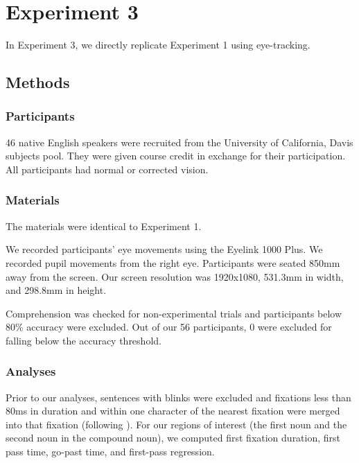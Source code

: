 \documentclass[
  12pt,
  letterpaper,
]{scrreprt}
\begin{document}
\section{Experiment 3}\label{experiment-3}

In Experiment 3, we directly replicate Experiment 1 using eye-tracking.

\subsection{Methods}\label{methods-2}

\subsubsection{Participants}\label{participants-2}

46 native English speakers were recruited from the University of
California, Davis subjects pool. They were given course credit in
exchange for their participation. All participants had normal or
corrected vision.

\subsubsection{Materials}\label{materials}

The materials were identical to Experiment 1.

We recorded participants' eye movements using the Eyelink 1000 Plus. We
recorded pupil movements from the right eye. Participants were seated
850mm away from the screen. Our screen resolution was 1920x1080, 531.3mm
in width, and 298.8mm in height.

Comprehension was checked for non-experimental trials and participants
below 80\% accuracy were excluded. Out of our 56 participants, 0 were
excluded for falling below the accuracy threshold.

\subsubsection{Analyses}\label{analyses}

Prior to our analyses, sentences with blinks were excluded and fixations
less than 80ms in duration and within one character of the nearest
fixation were merged into that fixation (following
). For
our regions of interest (the first noun and the second noun in the
compound noun), we computed first fixation duration, first pass time,
go-past time, and first-pass regression.
\end{document}
